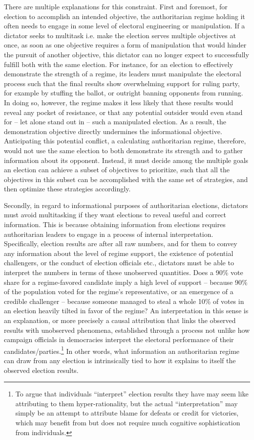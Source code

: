 \documentclass[12pt]{article}
\newcommand{\1}{\mathbbm{1}}
\begin{document}
There are multiple explanations for this constraint. First and foremost, for election to accomplish an intended objective, the authoritarian regime holding it often needs to engage in some level of electoral engineering or manipulation. If a dictator seeks to multitask i.e. make the election serves multiple objectives at once, as soon as one objective requires a form of manipulation that would hinder the pursuit of another objective, this dictator can no longer expect to successfully fulfill both with the same election. For instance, for an election to effectively demonstrate the strength of a regime, its leaders must manipulate the electoral process such that the final results show overwhelming support for ruling party, for example by stuffing the ballot, or outright banning opponents from running. In doing so, however, the regime makes it less likely that these results would reveal any pocket of resistance, or that any potential outsider would even stand for -- let alone stand out in -- such a manipulated election. As a result, the demonstration objective directly undermines the informational objective. Anticipating this potential conflict, a calculating authoritarian regime, therefore, would not use the same election to both demonstrate its strength and to gather information about its opponent. Instead, it must decide among the multiple goals an election can achieve a subset of objectives to prioritize, such that all the objectives in this subset can be accomplished with the same set of strategies, and then optimize these strategies accordingly.

Secondly, in regard to informational purposes of authoritarian elections, dictators must avoid multitasking if they want elections to reveal useful and correct information. This is because obtaining information from elections requires authoritarian leaders to engage in a process of internal interpretation. Specifically, election results are after all raw numbers, and for them to convey any information about the level of regime support, the existence of potential challengers, or the conduct of election officials etc., dictators must be able to interpret the numbers in terms of these unobserved quantities. Does a 90\% vote share for a regime-favored candidate imply a high level of support -- because 90\% of the population voted for the regime's representative, or an emergence of a credible challenger -- because someone managed to steal a whole 10\% of votes in an election heavily tilted in favor of the regime? An interpretation in this sense is an explanation, or more precisely a causal attribution that links the observed results with unobserved phenomena, established through a process not unlike how campaign officials in democracies interpret the electoral performance of their candidates/parties.\footnote{To argue that individuals ``interpret'' election results they have may seem like attributing to them hyper-rationality, but the actual ``interpretation'' may simply be an attempt to attribute blame for defeats or credit for victories, which may benefit from but does not require much cognitive sophistication from individuals.} In other words, what information an authoritarian regime can draw from any election is intrinsically tied to how it explains to itself the observed election results.
\end{document}
